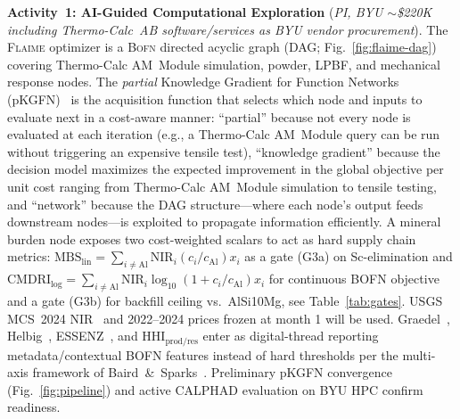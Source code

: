 \documentclass[11pt,letterpaper]{article}
\newcommand{\flaime}{\textsc{Flaime}}
\newcommand{\bofn}{\textsc{Bofn}}
\begin{document}
\textbf{Activity~1: AI-Guided Computational Exploration}
(\emph{PI, BYU {$\sim$}\$220K including Thermo-Calc~AB software/services as BYU vendor procurement}).
%
The \flaime{} optimizer is a \bofn{} directed acyclic graph
(DAG; Fig.~\ref{fig:flaime-dag})~\cite{sundar_2025_s4357802,paramore_2025_jactamat} covering
Thermo-Calc AM~Module simulation, powder, LPBF, and mechanical response nodes.
The \emph{partial} Knowledge Gradient for Function
Networks (pKGFN)~\cite{buathong_2023_23110214,buathong_2025_25061145}
is the acquisition function that selects which node and inputs to
evaluate next in a cost-aware manner: ``partial'' because not every
node is evaluated at each iteration (e.g., a Thermo-Calc AM~Module
query can be run without triggering an expensive tensile test),
``knowledge gradient'' because the decision model maximizes the expected
improvement in the global objective per unit cost
ranging from Thermo-Calc AM~Module simulation to tensile testing, and
``network'' because the DAG structure---where each node's output feeds downstream nodes---is exploited to propagate information efficiently.
A mineral burden node 
exposes two cost-weighted
scalars to act as hard supply chain metrics: $\mathrm{MBS}_{\text{lin}}{=}\sum_{i\neq\mathrm{Al}}\mathrm{NIR}_i(c_i/c_{\mathrm{Al}})x_i$
as a gate (G3a) on Sc-elimination and $\mathrm{CMDRI}_{\text{log}}{=}\sum_{i\neq\mathrm{Al}}\mathrm{NIR}_i\log_{10}(1+c_i/c_{\mathrm{Al}})x_i$
for continuous BOFN objective and a gate (G3b) for backfill ceiling vs.\ AlSi10Mg, see
Table~\ref{tab:gates}. USGS MCS~2024 NIR~\cite{usgs_mcs_2024}
and 2022--2024 prices frozen at month 1 
will be used. Graedel~\cite{graedel_2012_es203534}, Helbig~\cite{mulukutla_2024_ssrn4968},
ESSENZ~\cite{cimprich_2019_jiec1286}, and $\mathrm{HHI}_{\text{prod/res}}$
enter as digital-thread reporting metadata/contextual BOFN features instead of hard thresholds
per the multi-axis framework of Baird~\&~Sparks~\cite{titirici_2022_roadmap}.
Preliminary pKGFN convergence (Fig.~\ref{fig:pipeline}) and active
CALPHAD evaluation on BYU HPC confirm readiness.
\end{document}
